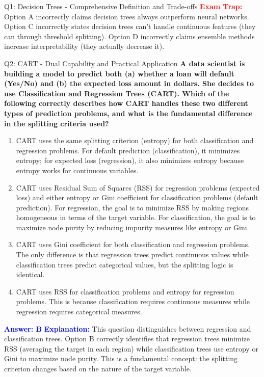 \documentclass[8pt]{beamer}
\begin{document}
\begin{frame}{Q1: Decision Trees - Comprehensive Definition and Trade-offs}
		\textcolor{red}{\textbf{Exam Trap:}} Option A incorrectly claims decision trees always outperform neural networks. Option C incorrectly states decision trees can't handle continuous features (they can through threshold splitting). Option D incorrectly claims ensemble methods increase interpretability (they actually decrease it). 
	\end{frame}
	
	\begin{frame}{Q2: CART - Dual Capability and Practical Application}
		\fontsize{6.5}{7.5}\selectfont
		\textbf{A data scientist is building a model to predict both (a) whether a loan will default (Yes/No) and (b) the expected loss amount in dollars. She decides to use Classification and Regression Trees (CART). Which of the following correctly describes how CART handles these two different types of prediction problems, and what is the fundamental difference in the splitting criteria used?}
		
		\begin{enumerate}
			\item CART uses the same splitting criterion (entropy) for both classification and regression problems. For default prediction (classification), it minimizes entropy; for expected loss (regression), it also minimizes entropy because entropy works for continuous variables.
			\item CART uses Residual Sum of Squares (RSS) for regression problems (expected loss) and either entropy or Gini coefficient for classification problems (default prediction). For regression, the goal is to minimize RSS by making regions homogeneous in terms of the target variable. For classification, the goal is to maximize node purity by reducing impurity measures like entropy or Gini.
			\item CART uses Gini coefficient for both classification and regression problems. The only difference is that regression trees predict continuous values while classification trees predict categorical values, but the splitting logic is identical.
			\item CART uses RSS for classification problems and entropy for regression problems. This is because classification requires continuous measures while regression requires categorical measures.
		\end{enumerate}
		
		\vspace{0.1cm}
		\textcolor{blue}{\textbf{Answer: B}}
		\vspace{0.1cm}
		\textcolor{blue}{\textbf{Explanation:}} This question distinguishes between regression and classification trees. Option B correctly identifies that regression trees minimize RSS (averaging the target in each region) while classification trees use entropy or Gini to maximize node purity. This is a fundamental concept: the splitting criterion changes based on the nature of the target variable.
		

\end{frame}
\end{document}
